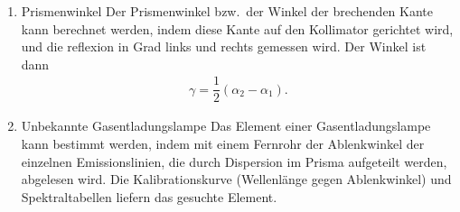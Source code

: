 \begin{enumerate}[label=--]
        \item Prismenwinkel \hspace{25pt}
                Der Prismenwinkel bzw.\ der Winkel der brechenden Kante kann berechnet werden, indem diese Kante auf den Kollimator gerichtet wird, und die reflexion in Grad links und rechts gemessen wird. 
                Der Winkel ist dann
                \begin{align} 
                        \gamma =\dfrac{1}{2}\left(\alpha _2-\alpha _1\right)
                .\end{align} 
        \item Unbekannte Gasentladungslampe \hspace{25pt}
                Das Element einer Gasentladungslampe kann bestimmt werden, indem mit einem Fernrohr der Ablenkwinkel der einzelnen Emissionslinien, die durch Dispersion im Prisma aufgeteilt werden, abgelesen wird.
                Die Kalibrationskurve (Wellenlänge gegen Ablenkwinkel) und Spektraltabellen liefern das gesuchte Element.
\end{enumerate}

\newpage
